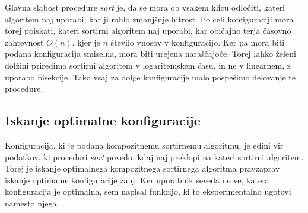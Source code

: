 \documentclass[a4paper,oneside,10pt]{article}
\begin{document}
Glavna slabost procedure \emph{sort} je, da se mora ob vsakem klicu odločiti, kateri
algoritem naj uporabi, kar ji rahlo zmanjšuje hitrost. Po celi konfiguraciji mora torej
poiskati, kateri sortirni algoritem naj uporabi, kar običajno terja časovno zahtevnost
$O(n)$, kjer je $n$ število vnosov v konfiguracijo. Ker pa mora biti podana konfiguracija
smiselna, mora biti urejena naraščajoče. Torej lahko želeni dolžini priredimo sortirni
algoritem v logaritemskem času, in ne v linearnem, z uporabo bisekcije. Tako vsaj za dolge
konfiguracije malo pospešimo delovanje te procedure.

\subsection{Iskanje optimalne konfiguracije}
\label{chapter:optimalconf}
Konfiguracija, ki je podana kompozitnemu sortirnemu algoritmu, je edini vir podatkov, ki
proceduri \emph{sort} povedo, kdaj naj preklopi na kateri sortirni algoritem.
Torej je iskanje optimalnega kompozitnega sortirnega algoritma pravzaprav iskanje optimalne
konfiguracije zanj. Ker uporabnik seveda ne ve, katera konfiguracija je optimalna, sem
napisal funkcijo, ki to eksperimentalno ugotovi namesto njega.
\end{document}
